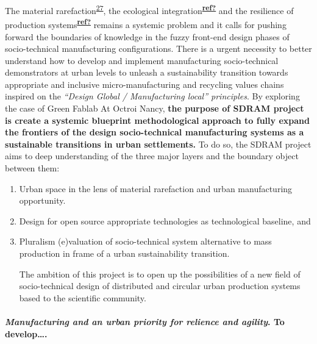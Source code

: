 \documentclass[
  11pt,
  a4paperpaper,
  onecolumn]{article}
\let\oldparagraph\paragraph
\renewcommand{\paragraph}[1]{\oldparagraph{#1}\mbox{}}
\let\paragraph\oldparagraph
\begin{document}
The material
rarefaction\textsuperscript{\protect\hyperlink{ref-hultman2021}{27}},
the ecological
integration\textsuperscript{\protect\hyperlink{ref-ref}{\textbf{ref?}}}
and the resilience of production
systems\textsuperscript{\protect\hyperlink{ref-ref}{\textbf{ref?}}}
remains a systemic problem and it calls for pushing forward the
boundaries of knowledge in the fuzzy front-end design phases of
socio-technical manufacturing configurations. There is a urgent
necessity to better understand how to develop and implement
manufacturing socio-technical demonstrators at urban levels to unleash a
sustainability transition towards appropriate and inclusive
micro-manufacturing and recycling values chains inspired on the
\emph{``Design Global / Manufacturing local'' principles}. By exploring
the case of Green Fablab At Octroi Nancy, \textbf{the purpose of SDRAM
project is create a systemic blueprint methodological approach to fully
expand the frontiers of the design socio-technical manufacturing systems
as a sustainable transitions in urban settlements.} To do so, the SDRAM
project aims to deep understanding of the three major layers and the
boundary object between them:

\begin{enumerate}
\def\labelenumi{\arabic{enumi}.}
\item
  Urban space in the lens of material rarefaction and urban
  manufacturing opportunity.
\item
  Design for open source appropriate technologies as technological
  baseline, and
\item
  Pluralism (e)valuation of socio-technical system alternative to mass
  production in frame of a urban sustainability transition.

  The ambition of this project is to open up the possibilities of a new
  field of socio-technical design of distributed and circular urban
  production systems based to the scientific community.
\end{enumerate}

\hypertarget{manufacturing-and-an-urban-priority-for-relience-and-agility.-to-develop.}{%
\paragraph{\texorpdfstring{\emph{Manufacturing and an urban priority for
relience and agility}. To
develop\ldots.}{Manufacturing and an urban priority for relience and agility. To develop\ldots.}}\label{manufacturing-and-an-urban-priority-for-relience-and-agility.-to-develop.}}
\end{document}
